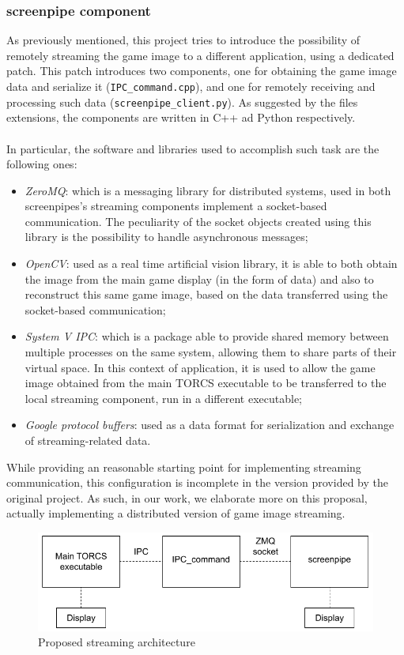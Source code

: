 \subsubsection{screenpipe component}
As previously mentioned, this project tries to introduce the possibility of remotely streaming the game image to a different application, using a dedicated patch. This patch introduces two components, one for obtaining the game image data and serialize it (\texttt{IPC\_command.cpp}), and one for remotely receiving and processing such data (\texttt{screenpipe\_client.py}). As suggested by the files extensions, the components are written in C++ ad Python respectively. \\ \\
In particular, the software and libraries used to accomplish such task are the following ones:
\begin{itemize}
	\item \textit{ZeroMQ}: which is a messaging library for distributed systems, used in both screenpipes's streaming components implement a socket-based communication. The peculiarity of the socket objects created using this library is the possibility to handle asynchronous messages;
	\item \textit{OpenCV}: used as a real time artificial vision library, it is able to both obtain the image from the main game display (in the form of data) and also to reconstruct this same game image, based on the data transferred using the socket-based communication;
	\item \textit{System V IPC}: which is a package able to provide shared memory between multiple processes on the same system, allowing them to share parts of their virtual space. In this context of application, it is used to allow the game image obtained from the main TORCS executable to be transferred to the local streaming component, run in a different executable;
	\item \textit{Google protocol buffers}: used as a data format for serialization and exchange of streaming-related data.
\end{itemize}
While providing an reasonable starting point for implementing streaming communication, this configuration is incomplete in the version provided by the original project. As such, in our work, we elaborate more on this proposal, actually implementing a distributed version of game image streaming.

\begin{figure}
	\centering
	\includegraphics[width=0.8\linewidth]{"immagini/Software development/patched-torcs-architecture"}
	\caption[Proposed streaming architecture]{Proposed streaming architecture}
	\label{fig:patched-torcs-architecture}
\end{figure}


